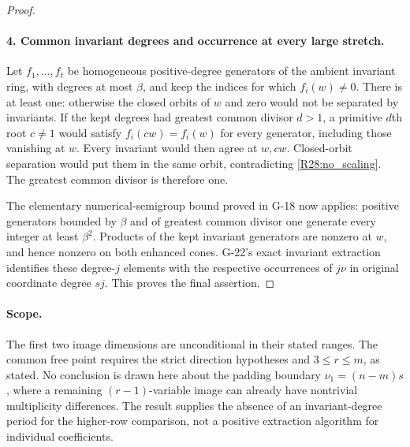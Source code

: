 \begin{proof}
\paragraph{4. Common invariant degrees and occurrence at every large stretch.}
Let $f_1,\ldots,f_t$ be homogeneous positive-degree generators
of the ambient invariant ring, with degrees at most $\beta$,
and keep the indices for which $f_i(w)\ne0$. There is at least
one: otherwise the closed orbits of $w$ and zero would not
be separated by invariants. If the kept degrees had greatest
common divisor $d>1$, a primitive $d$th root $c\ne1$ would
satisfy $f_i(cw)=f_i(w)$ for every generator, including those
vanishing at $w$. Every invariant would then agree at $w,cw$.
Closed-orbit separation would put them in the same orbit,
contradicting \eqref{R28:no_scaling}. The greatest common
divisor is therefore one.

The elementary numerical-semigroup bound proved in G-18
now applies: positive generators bounded by $\beta$ and of
greatest common divisor one generate every integer at least
$\beta^2$. Products of the kept invariant generators are
nonzero at $w$, and hence nonzero on both enhanced cones.
G-22's exact invariant extraction identifies these degree-$j$
elements with the respective occurrences of $j\nu$ in original
coordinate degree $sj$. This proves the final assertion.
\end{proof}

\paragraph{Scope.}
The first two image dimensions are unconditional in their
stated ranges. The common free point requires the strict
direction hypotheses and $3\leq r\leq m$, as stated.
No conclusion is drawn here about the padding boundary
$\nu_1=(n-m)s$, where a remaining $(r-1)$-variable image can
already have nontrivial multiplicity differences. The result
supplies the absence of an invariant-degree period for the
higher-row comparison, not a positive extraction algorithm
for individual coefficients.
